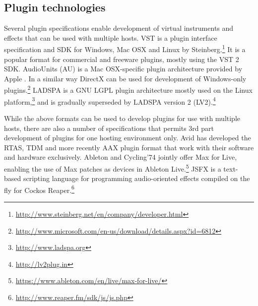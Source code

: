 \documentclass{article}
\begin{document}




\subsection{Plugin technologies}\label{sec:plugin-technologies}

Several plugin specifications enable development of virtual instruments and effects that can be used with multiple hosts.
VST is a plugin interface specification and SDK for Windows, Mac OSX and Linux by Steinberg.\footnote{\href{http://www.steinberg.net/en/company/developer.html}{http://www.steinberg.net/en/company/developer.html}}
It is a popular format for commercial and freeware plugins, mostly using the VST 2 SDK.
AudioUnits (AU) is a Mac OSX-specific plugin architecture provided by Apple \cite{apple2014:au}.
In a similar way DirectX can be used for development of Windows-only plugins.\footnote{\href{http://www.microsoft.com/en-us/download/details.aspx?id=6812}{http://www.microsoft.com/en-us/download/details.aspx?id=6812}}
LADSPA is a GNU LGPL plugin architecture mostly used on the Linux platform,\footnote{\href{http://www.ladspa.org}{http://www.ladspa.org}} and is gradually superseded by LADSPA version 2 (LV2).\footnote{\href{http://lv2plug.in}{http://lv2plug.in}}

While the above formats can be used to develop plugins for use with multiple hosts, there are also a number of specifications that permits 3rd part development of plugins for one hosting environment only.
Avid has developed the RTAS, TDM and more recently AAX plugin format that work with their software and hardware exclusively.
Ableton and Cycling'74 jointly offer Max for Live, enabling the use of Max patches as devices in Ableton Live.\footnote{\href{https://www.ableton.com/en/live/max-for-live/}{https://www.ableton.com/en/live/max-for-live/}} JSFX is a text-based scripting language for programming audio-oriented effects compiled on the fly for Cockos Reaper.\footnote{\href{http://www.reaper.fm/sdk/js/js.php}{http://www.reaper.fm/sdk/js/js.php}}
\end{document}
